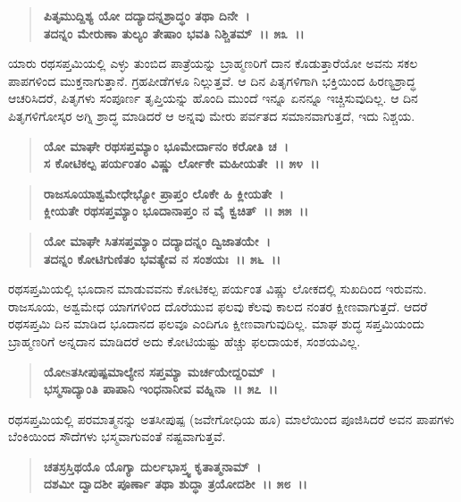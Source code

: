 \begin{verse}
\textbf{ಪಿತೃಮುದ್ದಿಶ್ಯ ಯೋ ದದ್ಯಾದನ್ನಶ್ರಾದ್ಧಂ ತಥಾ ದಿನೇ~।}\\\textbf{ತದನ್ನಂ ಮೇರುಣಾ ತುಲ್ಯಂ ತೇಷಾಂ ಭವತಿ ನಿಶ್ಚಿತಮ್~।। ೫೩~।।}
\end{verse}

ಯಾರು ರಥಸಪ್ತಮಿಯಲ್ಲಿ ಎಳ್ಳು ತುಂಬಿದ ಪಾತ್ರೆಯನ್ನು ಬ್ರಾಹ್ಮಣರಿಗೆ ದಾನ ಕೊಡುತ್ತಾ\-ರೆಯೋ ಅವನು ಸಕಲ ಪಾಪಗಳಿಂದ ಮುಕ್ತನಾಗುತ್ತಾನೆ. ಗ್ರಹಪೀಡೆಗಳೂ ನಿಲ್ಲುತ್ತವೆ. ಆ ದಿನ ಪಿತೃಗಳಿಗಾಗಿ ಭಕ್ತಿಯಿಂದ ಹಿರಣ್ಯಶ್ರಾದ್ಧ ಆಚರಿಸಿದರೆ, ಪಿತೃಗಳು ಸಂಪೂರ್ಣ ತೃಪ್ತಿಯನ್ನು ಹೊಂದಿ ಮುಂದೆ ಇನ್ನೂ ಏನನ್ನೂ ಇಚ್ಚಿಸುವುದಿಲ್ಲ. ಆ ದಿನ ಪಿತೃಗಳಿಗೋಸ್ಕರ ಅಗ್ನಿ ಶ್ರಾದ್ಧ ಮಾಡಿದರೆ ಆ ಅನ್ನವು ಮೇರು ಪರ್ವತದ ಸಮಾನವಾಗುತ್ತದೆ, ಇದು ನಿಶ್ಚಯ.

\begin{verse}
\textbf{ಯೋ ಮಾಘೇ ರಥಸಪ್ತಮ್ಯಾಂ ಭೂಮೇರ್ದಾನಂ ಕರೋತಿ ಚ~।}\\\textbf{ಸ ಕೋಟಿಕಲ್ಪ ಪರ್ಯಂತಂ ವಿಷ್ಣು ರ್ಲೋಕೇ ಮಹೀಯತೇ~।। ೫೪~।।}
\end{verse}

\begin{verse}
\textbf{ರಾಜಸೂಯಾಶ್ವಮೇಧೇಭ್ಯೋ ಪ್ರಾಪ್ತಂ ಲೊಕೇ ಹಿ ಕ್ಲೀಯತೇ~।}\\\textbf{ಕ್ಲೀಯತೇ ರಥಸಪ್ತಮ್ಯಾಂ ಭೂದಾನಾಪ್ತಂ ನ ವೈ ಕ್ವಚಿತ್~।। ೫೫~।। }
\end{verse}

\begin{verse}
\textbf{ಯೋ ಮಾಘೇ ಸಿತಸಪ್ತಮ್ಯಾಂ ದದ್ಯಾದನ್ನಂ ದ್ವಿಜಾತಯೇ~।}\\\textbf{ತದನ್ನಂ ಕೋಟಿಗುಣಿತಂ ಭವತ್ಯೇವ ನ ಸಂಶಯಃ~।। ೫೬~।।}
\end{verse}

ರಥಸಪ್ತಮಿಯಲ್ಲಿ ಭೂದಾನ ಮಾಡುವವನು ಕೋಟಿಕಲ್ಪ ಪರ್ಯಂತ ವಿಷ್ಣು ಲೋಕದಲ್ಲಿ ಸುಖದಿಂದ ಇರುವನು. ರಾಜಸೂಯ, ಅಶ್ವಮೇಧ ಯಾಗಗಳಿಂದ ದೊರೆಯುವ ಫಲವು ಕೆಲವು ಕಾಲದ ನಂತರ ಕ್ಷೀಣವಾಗುತ್ತದೆ. ಆದರೆ ರಥಸಪ್ತಮಿ ದಿನ ಮಾಡಿದ ಭೂದಾನದ ಫಲವೂ ಎಂದಿಗೂ ಕ್ಷೀಣವಾಗುವುದಿಲ್ಲ. ಮಾಘ ಶುದ್ಧ ಸಪ್ತಮಿಯಂದು ಬ್ರಾಹ್ಮಣರಿಗೆ ಅನ್ನದಾನ ಮಾಡಿದರೆ ಅದು ಕೋಟಿಯಷ್ಟು ಹೆಚ್ಚು ಫಲದಾಯಕ, ಸಂಶಯವಿಲ್ಲ.

\begin{verse}
\textbf{ಯೋsತಸೀಪುಷ್ಪಮಾಲ್ಯೇನ ಸಪ್ತಮ್ಯಾ ಮರ್ಚಯೇದ್ದರಿಮ್~।}\\\textbf{ಭಸ್ಮಸಾದ್ಯಾಂತಿ ಪಾಪಾನಿ ಇಂಧನಾನೀವ ವಹ್ನಿನಾ~।। ೫೭~।।}
\end{verse}

ರಥಸಪ್ತಮಿಯಲ್ಲಿ ಪರಮಾತ್ಮನನ್ನು ಅತಸೀಪುಷ್ಪ (ಜವೇಗೋಧಿಯ ಹೂ) ಮಾಲೆಯಿಂದ ಪೂಜಿಸಿದರೆ ಅವನ ಪಾಪಗಳು ಬೆಂಕಿಯಿಂದ ಸೌದೆಗಳು ಭಸ್ಮವಾಗುವಂತೆ ನಷ್ಟವಾಗುತ್ತವೆ.

\begin{verse}
\textbf{ಚತಸ್ರಸ್ತಿಥಯೊ ಯೊಗ್ಯಾ ದುರ್ಲಭಾಸ್ತ್ವ ಕೃತಾತ್ಮನಾಮ್~।}\\\textbf{ದಶಮೀ ದ್ವಾದಶೀ ಪೂರ್ಣಾ ತಥಾ ಶುದ್ಧಾ ತ್ರಯೋದಶೀ~।। ೫೮~।।}
\end{verse}

